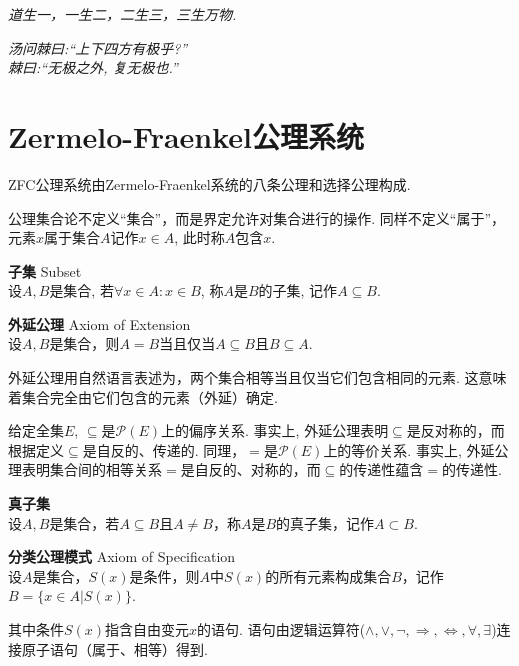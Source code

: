 
\par \emph{道生一，一生二，二生三，三生万物.} 
\par {}

\par \emph{汤问棘曰:``上下四方有极乎?''\\ 棘曰:``无极之外, 复无极也.''}
\par {}

\section{Zermelo-Fraenkel公理系统}

\par ZFC公理系统由Zermelo-Fraenkel系统的八条公理和选择公理构成. 

\par 公理集合论不定义“集合”，而是界定允许对集合进行的操作. 同样不定义“属于”，元素$x$属于集合$A$记作$x\in A$, 此时称$A$包含$x$.

\begin{dfn} \textbf{子集} Subset\\
设$A,B$是集合, 若$\forall x \in A: x \in B$, 称$A$是$B$的子集, 记作$A\subseteq B$. 
\end{dfn}

\begin{axi} \textbf{外延公理} Axiom of Extension\\
设$A,B$是集合，则$A=B$当且仅当$A\subseteq B$且$B\subseteq A$. 
\end{axi}
\par 外延公理用自然语言表述为，两个集合相等当且仅当它们包含相同的元素. 这意味着集合完全由它们包含的元素（外延）确定. 

\par 给定全集$E$, $\subseteq$是$\mathcal{P}(E)$上的偏序关系. 事实上, 外延公理表明$\subseteq$是反对称的，而根据定义$\subseteq$是自反的、传递的. 同理，$=$是$\mathcal{P}(E)$上的等价关系. 事实上, 外延公理表明集合间的相等关系$=$是自反的、对称的，而$\subseteq$的传递性蕴含$=$的传递性.

\begin{dfn} \textbf{真子集}\\
设$A,B$是集合，若$A\subseteq B$且$A\neq B$，称$A$是$B$的真子集，记作$A\subset B$. 
\end{dfn}

\begin{axi} \textbf{分类公理模式} Axiom of Specification\\
设$A$是集合，$S(x)$是条件，则$A$中$S(x)$的所有元素构成集合$B$，记作$B=\{x\in A\vert S(x)\}$. 
\end{axi}
其中条件$S(x)$指含自由变元$x$的语句. 语句由逻辑运算符($\land, \lor, \lnot, \Rightarrow, \Leftrightarrow, \forall, \exists$)连接原子语句（属于、相等）得到. 

